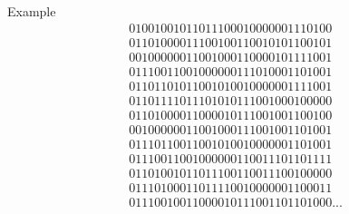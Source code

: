 \documentclass{beamer}
\begin{document}
\begin{frame}[t]{Example}
\[
\begin{array}{l}
01001001011011100010000001110100\\
01101000011100100110010101100101\\
00100000011001000110000101111001\\
01110011001000000111010001101001\\
01101101011001010010000001111001\\
01101111011101010111001000100000\\
01101000011000010111001001100100\\
00100000011001000111001001101001\\
01110110011001010010000001101001\\
01110011001000000110011101101111\\
01101001011011100110011100100000\\
01110100011011110010000001100011\\
01110010011000010111001101101000...
\end{array}
\]
\end{frame}	
\end{document}
